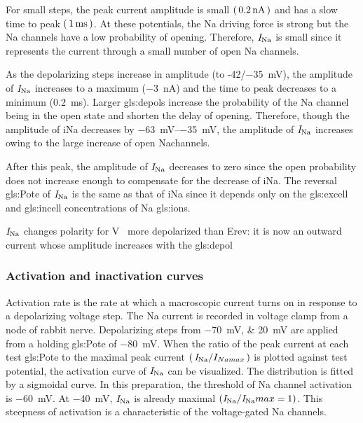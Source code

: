 \documentclass[class={myRUCProject}, crop=false]{standalone}
\begin{document}
For small steps, the peak current amplitude is small \(\left(\,\qty{0.2}{\nano\ampere}\,\right)\) and has a slow time to peak \(\left(\,\qty{1}{\milli\second}\,\right)\). At these potentials, the \gls{Na} driving force is strong but the \gls{Na} channels have a low probability of opening. Therefore, \(\mathit{I}_\mathrm{Na}\) is small since it represents the current through a small number of open \gls{Na} channels. 

As the depolarizing steps increase in amplitude (to -42/\qty{-35}{\mV}), the amplitude of \(\mathit{I}_\mathrm{Na}\) increases to a maximum (\qty{-3}{\nA}) and the time to peak decreases to a minimum (\qty{0.2}{\ms}). Larger \glspl{gls:depol} increase the probability of the \gls{Na} channel being in the open state and shorten the delay of opening. Therefore, though the amplitude of iNa decreases by \qtyrange{-63}{-35}{\mV}, the amplitude of \(\mathit{I}_\mathrm{Na}\) increases owing to the large increase of open \gls{Na}channels. 

After this peak, the amplitude of \(\mathit{I}_\mathrm{Na}\) decreases to zero since the open probability does not increase enough to compensate for the decrease of iNa. The reversal \gls{gls:Pote} of \(\mathit{I}_\mathrm{Na}\) is the same as that of iNa since it depends only on the \gls{gls:excell} and \gls{gls:incell} concentrations of \gls{Na} \glspl{gls:ion}.

\(\mathit{I}_\mathrm{Na}\) changes polarity for \unit{\V\membrane} more depolarized than Erev: it is now an outward current whose amplitude increases with the \gls{gls:depol} 

\subsubsection{Activation and inactivation curves }
Activation rate is the rate at which a macroscopic current turns on in response to a depolarizing voltage step. The \gls{Na} current is recorded in voltage clamp from a node of rabbit nerve. Depolarizing steps from \qtylist{-70;20}{\mV} are applied from a holding \gls{gls:Pote} of \qty{-80}{\mV}. When the ratio of the peak current at each test \gls{gls:Pote} to the maximal peak current \(\left(\,\mathit{I}_\mathrm{Na}/I_{Namax}\,\right)\) is plotted against test potential, the activation curve of \(\mathit{I}_\mathrm{Na}\) can be visualized. The distribution is fitted by a sigmoidal curve. In this preparation, the threshold of \gls{Na} channel activation is \qty{-60}{\mV}. At \qty{-40}{\mV}, \(\mathit{I}_\mathrm{Na}\) is already maximal \((\mathit{I}_\mathrm{Na}/\mathit{I}_\mathrm{Na}{}max = 1)\). This steepness of activation is a characteristic of the voltage-gated \gls{Na} channels. 
\end{document}
